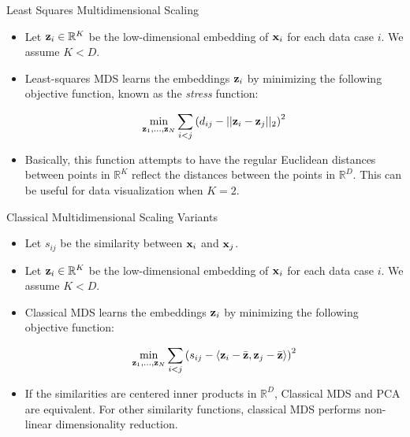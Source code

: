 \documentclass[serif,xcolor=pdftex,dvipsnames,table,hyperref={bookmarks=false,breaklinks}]{beamer}
\begin{document}
\begin{frame}[t]{Least Squares Multidimensional Scaling}

\begin{itemize}
\item Let ${\mathbf{z}}_i \in \mathbb{R}^{K}$ be the low-dimensional embedding of 
${\mathbf{x}}_i$ for each data case $i$. We assume $K<D$.

\pause\item Least-squares MDS learns the embeddings ${\mathbf{z}}_i$ by minimizing 
the following objective function, known as the \textit{stress} function:

\pause

$$\min_{\mathbf{z}_1,...,\mathbf{z}_N} \sum_{i<j} \left( d_{ij} - 
||{\mathbf{z}}_i-{\mathbf{z}}_j||_2\right)^2$$

\pause\item Basically, this function attempts to have the regular Euclidean 
distances between points in $\mathbb{R}^K$ reflect the distances between the 
points in $\mathbb{R}^D$. This can be useful for data visualization when $K=2$.

\end{itemize} 
\end{frame}

\begin{frame}[t]{Classical Multidimensional Scaling Variants}

\begin{itemize}
\item Let $s_{ij}$ be the similarity between ${\mathbf{x}}_i$ and ${\mathbf{x}}_j$. 


\pause\item Let ${\mathbf{z}}_i \in \mathbb{R}^{K}$ be the low-dimensional embedding 
of ${\mathbf{x}}_i$ for each data case $i$. We assume $K<D$.

\pause\item Classical MDS learns the embeddings ${\mathbf{z}}_i$ by minimizing 
the following objective function:

\pause

$$\min_{\mathbf{z}_1,...,\mathbf{z}_N} \sum_{i<j} \left( s_{ij} - 
\langle {\mathbf{z}}_i-\bar{{\mathbf{z}}}, {\mathbf{z}}_j-\bar{{\mathbf{z}}}\rangle \right)^2$$

\pause\item If the similarities are centered inner products in $\mathbb{R}^D$, 
Classical MDS and PCA are equivalent. For other similarity functions, classical 
MDS performs non-linear dimensionality reduction.

\end{itemize}  
\end{frame}
\end{document}
